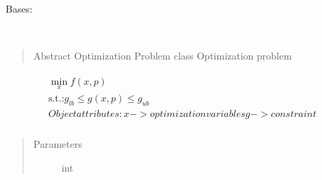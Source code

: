 \documentclass[letterpaper,10pt,english]{sphinxmanual}
\begin{document}
\begin{fulllineitems}
\label{\detokenize{yaocptool.optimization:yaocptool.optimization.abstract_optimization_problem.AbstractOptimizationProblem}}
Bases: 

\begin{fulllineitems}
\label{\detokenize{yaocptool.optimization:yaocptool.optimization.abstract_optimization_problem.AbstractOptimizationProblem.__init__}}~\begin{quote}

Abstract Optimization Problem class
Optimization problem
\end{quote}
\begin{align*}\!\begin{aligned}
\min_x f(x, p)\\
\textrm{s.t.:} g_{lb} \leq g(x,p) \leq g_{ub}\\
Object attributes:
x -> optimization variables
g -> constraint\\
\end{aligned}\end{align*}\begin{quote}\begin{description}
\item[{Parameters}] \leavevmode
{} \textendash{} int

\end{description}\end{quote}

\end{fulllineitems}


\begin{fulllineitems}
\label{\detokenize{yaocptool.optimization:yaocptool.optimization.abstract_optimization_problem.AbstractOptimizationProblem.create_parameter}}
\end{fulllineitems}


\end{fulllineitems}
\end{document}
